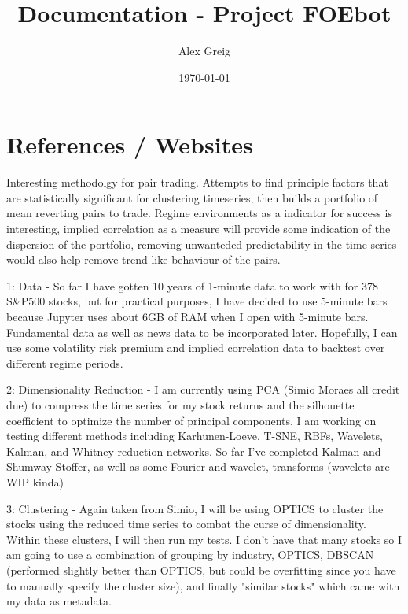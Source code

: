 \documentclass[11pt]{article}
\title{Documentation - Project FOEbot}
\author{Alex Greig}
\date{\today}
\begin{document}
\maketitle

\tableofcontents

\vspace{6cm}
\section{References / Websites}
Interesting methodolgy for pair trading. Attempts to find principle factors that are statistically significant for clustering timeseries, then builds a portfolio of mean reverting pairs to trade. Regime environments as a indicator for success is interesting, implied correlation as a measure will provide some indication of the dispersion of the portfolio, removing unwanteded predictability in the time series would also help remove trend-like behaviour of the pairs. 

1: Data - So far I have gotten 10 years of 1-minute data to work with for 378 S\&P500 stocks, but for practical purposes, I have decided to use 5-minute bars because Jupyter uses about 6GB of RAM when I open with 5-minute bars. Fundamental data as well as news data to be incorporated later. Hopefully, I can use some volatility risk premium and implied correlation data to backtest over different regime periods.

2: Dimensionality Reduction - I am currently using PCA (Simio Moraes all credit due) to compress the time series for my stock returns and the silhouette coefficient to optimize the number of principal components. I am working on testing different methods including Karhunen-Loeve, T-SNE, RBFs, Wavelets, Kalman, and Whitney reduction networks. So far I've completed Kalman and Shumway Stoffer, as well as some Fourier and wavelet, transforms (wavelets are WIP kinda)

3: Clustering - Again taken from Simio, I will be using OPTICS to cluster the stocks using the reduced time series to combat the curse of dimensionality. Within these clusters, I will then run my tests. I don't have that many stocks so I am going to use a combination of grouping by industry, OPTICS, DBSCAN (performed slightly better than OPTICS, but could be overfitting since you have to manually specify the cluster size), and finally "similar stocks" which came with my data as metadata.
\end{document}
